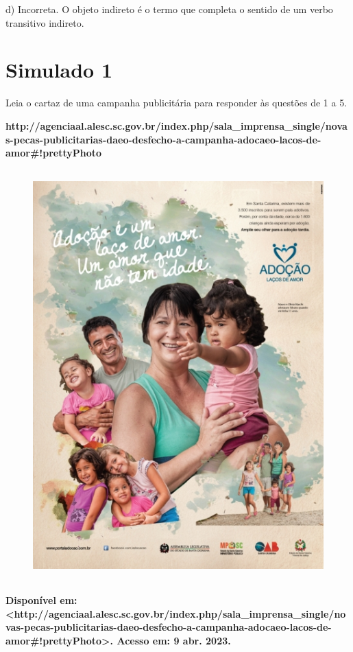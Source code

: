 d) Incorreta. O objeto indireto é o termo que completa o sentido de um
verbo transitivo indireto.

\chapter{Simulado 1}

Leia o cartaz de uma campanha publicitária para responder às questões de
1 a 5.

\textbf{http://agenciaal.alesc.sc.gov.br/index.php/sala\_imprensa\_single/novas-pecas-publicitarias-daeo-desfecho-a-campanha-adocaeo-lacos-de-amor\#!prettyPhoto}

\begin{figure}
\centering
\includegraphics[width=4.68750in,height=6.25000in]{./_SAEB_9_POR/media/image33.jpeg}
\caption{}
\end{figure}

\textbf{Disponível em:
\textless{}http://agenciaal.alesc.sc.gov.br/index.php/sala\_imprensa\_single/novas-pecas-publicitarias-daeo-desfecho-a-campanha-adocaeo-lacos-de-amor\#!prettyPhoto\textgreater{}.
Acesso em: 9 abr. 2023.}

